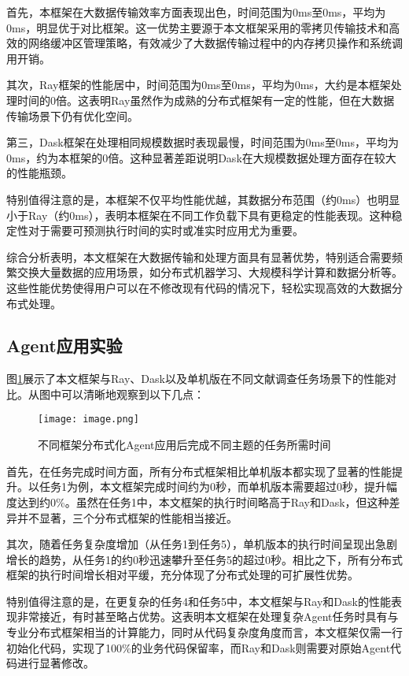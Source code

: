 首先，本框架在大数据传输效率方面表现出色，时间范围为0ms至0ms，平均为0ms，明显优于对比框架。这一优势主要源于本文框架采用的零拷贝传输技术和高效的网络缓冲区管理策略，有效减少了大数据传输过程中的内存拷贝操作和系统调用开销。

其次，Ray框架的性能居中，时间范围为0ms至0ms，平均为0ms，大约是本框架处理时间的0倍。这表明Ray虽然作为成熟的分布式框架有一定的性能，但在大数据传输场景下仍有优化空间。

第三，Dask框架在处理相同规模数据时表现最慢，时间范围为0ms至0ms，平均为0ms，约为本框架的0倍。这种显著差距说明Dask在大规模数据处理方面存在较大的性能瓶颈。

特别值得注意的是，本框架不仅平均性能优越，其数据分布范围（约0ms）也明显小于Ray（约0ms），表明本框架在不同工作负载下具有更稳定的性能表现。这种稳定性对于需要可预测执行时间的实时或准实时应用尤为重要。

综合分析表明，本文框架在大数据传输和处理方面具有显著优势，特别适合需要频繁交换大量数据的应用场景，如分布式机器学习、大规模科学计算和数据分析等。这些性能优势使得用户可以在不修改现有代码的情况下，轻松实现高效的大数据分布式处理。

\subsection{Agent应用实验}


图\ref{fig:exp_agent}展示了本文框架与Ray、Dask以及单机版在不同文献调查任务场景下的性能对比。从图中可以清晰地观察到以下几点：

\begin{figure}[htbp]
    \centering
    \texttt{[image: image.png]}
    \caption{不同框架分布式化Agent应用后完成不同主题的任务所需时间}
    \label{fig:exp_agent}
\end{figure}

首先，在任务完成时间方面，所有分布式框架相比单机版本都实现了显著的性能提升。以任务1为例，本文框架完成时间约为0秒，而单机版本需要超过0秒，提升幅度达到约0\%。虽然在任务1中，本文框架的执行时间略高于Ray和Dask，但这种差异并不显著，三个分布式框架的性能相当接近。

其次，随着任务复杂度增加（从任务1到任务5），单机版本的执行时间呈现出急剧增长的趋势，从任务1的约0秒迅速攀升至任务5的超过0秒。相比之下，所有分布式框架的执行时间增长相对平缓，充分体现了分布式处理的可扩展性优势。

特别值得注意的是，在更复杂的任务4和任务5中，本文框架与Ray和Dask的性能表现非常接近，有时甚至略占优势。这表明本文框架在处理复杂Agent任务时具有与专业分布式框架相当的计算能力，同时从代码复杂度角度而言，本文框架仅需一行初始化代码，实现了100\%的业务代码保留率，而Ray和Dask则需要对原始Agent代码进行显著修改。

